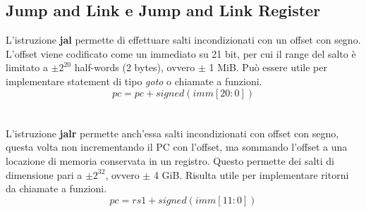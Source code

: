 \subsection{Jump and Link e Jump and Link Register}
L'istruzione \textbf{jal} permette di effettuare salti incondizionati con un offset con segno. L'offset viene codificato come un immediato su 21 bit, per cui il range del salto è limitato a \(\pm2^{20}\) half-words (2 bytes), ovvero \(\pm\) 1 MiB. Può essere utile per implementare statement di tipo \textit{goto} o chiamate a funzioni.
\[pc=pc+signed(imm[20:0])\]
\\
\\
L'istruzione \textbf{jalr} permette anch'essa salti incondizionati con offset con segno, questa volta non incrementando il PC con l'offset, ma sommando l'offset a una locazione di memoria conservata in un registro. Questo permette dei salti di dimensione pari a \(\pm2^{32}\), ovvero \(\pm\) 4 GiB. Risulta utile per implementare ritorni da chiamate a funzioni.
\[pc=rs1+signed(imm[11:0])\]

